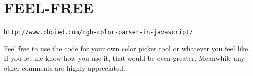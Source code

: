 \chapter{FEEL-\/\+FREE }
\hypertarget{md__c_1_2_users_2saket_2_one_drive_2_desktop_2e_pathshala_2epathshala-_web_2node__modules_2rgbcolor_2_f_e_e_l-_f_r_e_e}{}\label{md__c_1_2_users_2saket_2_one_drive_2_desktop_2e_pathshala_2epathshala-_web_2node__modules_2rgbcolor_2_f_e_e_l-_f_r_e_e}
\href{http://www.phpied.com/rgb-color-parser-in-javascript/}{\texttt{http\+://www.\+phpied.\+com/rgb-\/color-\/parser-\/in-\/javascript/}}

Feel free to use the code for your own color picker tool or whatever you feel like. If you let me know how you use it, that would be even greater. Meanwhile any other comments are highly appreciated. 